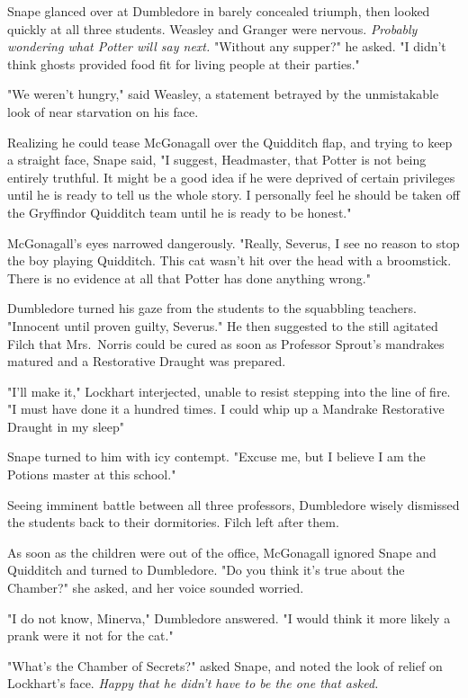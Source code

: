 Snape glanced over at Dumbledore in barely concealed triumph, then looked quickly at all three students. Weasley and Granger were nervous. \emph{Probably wondering what Potter will say next.} "Without any supper?" he asked. "I didn't think ghosts provided food fit for living people at their parties."

"We weren't hungry," said Weasley, a statement betrayed by the unmistakable look of near starvation on his face.

Realizing he could tease McGonagall over the Quidditch flap, and trying to keep a straight face, Snape said, "I suggest, Headmaster, that Potter is not being entirely truthful. It might be a good idea if he were deprived of certain privileges until he is ready to tell us the whole story. I personally feel he should be taken off the Gryffindor Quidditch team until he is ready to be honest."

McGonagall's eyes narrowed dangerously. "Really, Severus, I see no reason to stop the boy playing Quidditch. This cat wasn't hit over the head with a broomstick. There is no evidence at all that Potter has done anything wrong."

Dumbledore turned his gaze from the students to the squabbling teachers. "Innocent until proven guilty, Severus." He then suggested to the still agitated Filch that Mrs.~Norris could be cured as soon as Professor Sprout's mandrakes matured and a Restorative Draught was prepared.

"I'll make it," Lockhart interjected, unable to resist stepping into the line of fire. "I must have done it a hundred times. I could whip up a Mandrake Restorative Draught in my sleep{\el}"

Snape turned to him with icy contempt. "Excuse me, but I believe I am the Potions master at this school."

Seeing imminent battle between all three professors, Dumbledore wisely dismissed the students back to their dormitories. Filch left after them.

As soon as the children were out of the office, McGonagall ignored Snape and Quidditch and turned to Dumbledore. "Do you think it's true about the Chamber?" she asked, and her voice sounded worried.

"I do not know, Minerva," Dumbledore answered. "I would think it more likely a prank were it not for the cat."

"What's the Chamber of Secrets?" asked Snape, and noted the look of relief on Lockhart's face. \emph{Happy that he didn't have to be the one that asked.}

